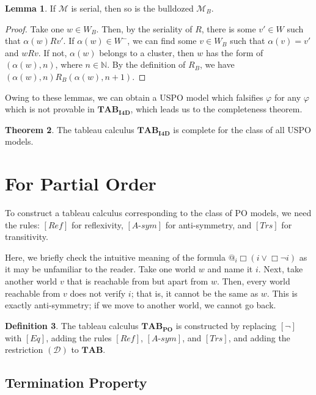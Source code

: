 \documentclass{article}
\theoremstyle{definition}
\newtheorem{definition}{Definition}[section]
\newtheorem{lemma}[definition]{Lemma}
\newtheorem{theorem}[definition]{Theorem}
\newcommand{\Kmodel}{\mathcal{M}}
\newcommand{\tableau}{\mathbf{TAB}}
\newcommand{\Drest}{(\mathcal{D})}
\newcommand{\reflex}{\mathit{Ref}}
\newcommand{\trans}{\mathit{Trs}}
\newcommand{\antisym}{\mathit{A\text{-}sym}}
\newcommand{\reflexivity}{\mathit{Eq}}
\newcommand{\tableauIFD}{\mathbf{TAB}_{\mathbf{I4D}}}
\newcommand{\tableauPO}{\mathbf{TAB}_{\textbf{PO}}}
\begin{document}
\begin{lemma}
    If $\Kmodel$ is serial, then so is the bulldozed $\Kmodel_B$.
\end{lemma}
\begin{proof}
    Take one $w \in W_B$. Then, by the seriality of $R$, there is some $v' \in W$ such that $\alpha(w) R v'$. If $\alpha(w) \in W^-$, we can find some $v \in W_B$ such that $\alpha(v) = v'$ and $w R v$. If not, $\alpha(w)$ belongs to a cluster, then $w$ has the form of $(\alpha(w), n)$, where $n \in \mathbb{N}$. By the definition of $R_B$, we have $(\alpha(w), n) R_B (\alpha(w), n+1)$.
\end{proof}

Owing to these lemmas, we can obtain a USPO model which falsifies $\varphi$ for any $\varphi$ which is not provable in $\tableauIFD$, which leads us to the completeness theorem.

\begin{theorem}
    The tableau calculus $\tableauIFD$ is complete for the class of all USPO models.
    \label{thmcompleteI4D}
\end{theorem}

\section{For Partial Order}
\label{secPO}

To construct a tableau calculus corresponding to the class of PO models, we need the rules: $[\reflex]$ for reflexivity, $[\antisym]$ for anti-symmetry, and $[\trans]$ for transitivity.

Here, we briefly check the intuitive meaning of the formula $@_i \Box (i \lor \Box \neg i)$ as it may be unfamiliar to the reader. Take one world $w$ and name it $i$. Next, take another world $v$ that is reachable from but apart from $w$. Then, every world reachable from $v$ does not verify $i$; that is, it cannot be the same as $w$. This is exactly anti-symmetry; if we move to another world, we cannot go back.
\begin{definition}
    The tableau calculus $\tableauPO$ is constructed by replacing $[\neg]$ with $[\reflexivity]$, adding the rules $[\reflex]$, $[\antisym]$, and $[\trans]$, and adding the restriction $\Drest$ to $\tableau$.
\end{definition}

\subsection{Termination Property}
\label{subsectermPO}
\end{document}
